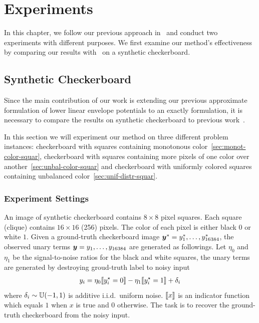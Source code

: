 
\chapter{Experiments}
\label{cha:Experiments}

In this chapter, we follow our previous approach
in~\cite{gouldlearning} and conduct two experiments with
different purposes. We first examine our method's effectiveness
by comparing our results with~\cite{gouldlearning,Gould:ICML2011}
on a synthetic checkerboard.

\section{Synthetic Checkerboard}
\label{sec:synth-check}

Since the main contribution of our work is extending our previous
approximate formulation of lower linear envelope potentials to an
exactly formulation, it is necessary to compare the results on
synthetic checkerboard to previous work~\cite{gouldlearning}.

In this section we will experiment our method on three different
problem instances: checkerboard with squares containing
monotonous color~\ref{sec:monot-color-squar}, checkerboard with
squares containing more pixels of one color over
another~\ref{sec:unbal-color-squar} and checkerboard with
uniformly colored squares containing unbalanced
color~\ref{sec:unif-distr-squar}.

\subsection{Experiment Settings}
\label{sec:experiment-settings}

An image of synthetic checkerboard contains $8 \times 8$ pixel
squares. Each square (clique) contains $16 \times 16$ (256)
pixels. The color of each pixel is either black $0$ or white $1$.
Given a ground-truth checkerboard image
${\bm{y}}^*=y^*_1,\dots,y^*_{16384}$, the observed unary terms
${\bm{y}}=y_1,\dots,y_{16384}$ are generated as followings. Let
$\eta_0$ and $\eta_1$ be the signal-to-noise ratios for the black
and white squares, the unary terms are generated by destroying
groud-truth label to noisy input
\begin{align}
  \label{eq:noisy_checkerboard}
  y_i = \eta_0 \ind{y^\star_i = 0} - \eta_1 \ind{y^\star_i = 1} + \delta_i
\end{align}
where $\delta_i
\sim {\mathbb{U}}(-1, 1)$ is additive i.i.d.\ uniform noise. $\ind{x}$ is
an indicator function which equals $1$ when $x$ is true and $0$
otherwise. The task is to recover the ground-truth checkerboard
from the noisy input.

